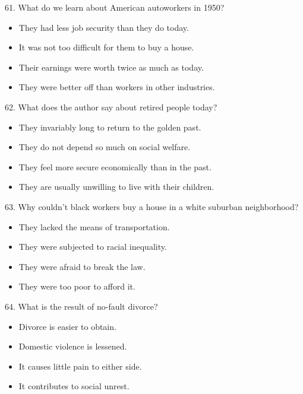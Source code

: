 \documentclass[UTF8,11pt]{ctexart}
\begin{document}
61. What do we learn about American autoworkers in 1950?


\begin{itemize}[leftmargin=2em,itemsep=.2em,topsep=.4em]\item[A.] They had less job security than they do today.
\item[B.] It was not too difficult for them to buy a house.
\item[C.] Their earnings were worth twice as much as today.
\item[D.] They were better off than workers in other industries.
\end{itemize}

62. What does the author say about retired people today?


\begin{itemize}[leftmargin=2em,itemsep=.2em,topsep=.4em]\item[A.] They invariably long to return to the golden past.
\item[B.] They do not depend so much on social welfare.
\item[C.] They feel more secure economically than in the past.
\item[D.] They are usually unwilling to live with their children.
\end{itemize}

63. Why couldn’t black workers buy a house in a white suburban neighborhood?


\begin{itemize}[leftmargin=2em,itemsep=.2em,topsep=.4em]\item[A.] They lacked the means of transportation.
\item[B.] They were subjected to racial inequality.
\item[C.] They were afraid to break the law.
\item[D.] They were too poor to afford it.
\end{itemize}

64. What is the result of no-fault divorce?


\begin{itemize}[leftmargin=2em,itemsep=.2em,topsep=.4em]\item[A.] Divorce is easier to obtain.
\item[B.] Domestic violence is lessened.
\item[C.] It causes little pain to either side.
\item[D.] It contributes to social unrest.
\end{itemize}
\end{document}
